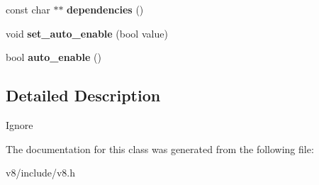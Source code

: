 \begin{DoxyCompactItemize}
\item 
\hypertarget{classv8_1_1Extension_adbec8a811d5a4554678da4a5d55dda6d}{}const char $\ast$$\ast$ {\bfseries dependencies} ()\label{classv8_1_1Extension_adbec8a811d5a4554678da4a5d55dda6d}

\item 
\hypertarget{classv8_1_1Extension_af5b752ba211315b6e9dac5c0e6e638e8}{}void {\bfseries set\+\_\+auto\+\_\+enable} (bool value)\label{classv8_1_1Extension_af5b752ba211315b6e9dac5c0e6e638e8}

\item 
\hypertarget{classv8_1_1Extension_aee87ef4f9c3d7880fc3b28765d28e516}{}bool {\bfseries auto\+\_\+enable} ()\label{classv8_1_1Extension_aee87ef4f9c3d7880fc3b28765d28e516}

\end{DoxyCompactItemize}


\subsection{Detailed Description}
Ignore 

The documentation for this class was generated from the following file\+:\begin{DoxyCompactItemize}
\item 
v8/include/v8.\+h\end{DoxyCompactItemize}
